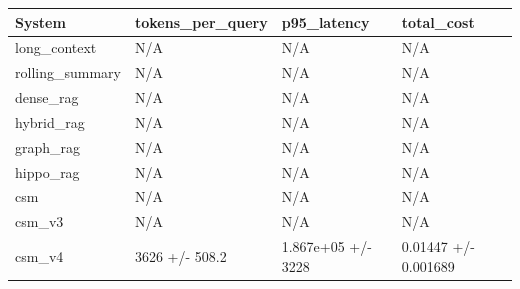\begin{tabular}{llll}
System & tokens_per_query & p95_latency & total_cost \\
\hline
long\_context & N/A & N/A & N/A \\
rolling\_summary & N/A & N/A & N/A \\
dense\_rag & N/A & N/A & N/A \\
hybrid\_rag & N/A & N/A & N/A \\
graph\_rag & N/A & N/A & N/A \\
hippo\_rag & N/A & N/A & N/A \\
csm & N/A & N/A & N/A \\
csm\_v3 & N/A & N/A & N/A \\
csm\_v4 & 3626 +/- 508.2 & 1.867e+05 +/- 3228 & 0.01447 +/- 0.001689 \\
\end{tabular}
